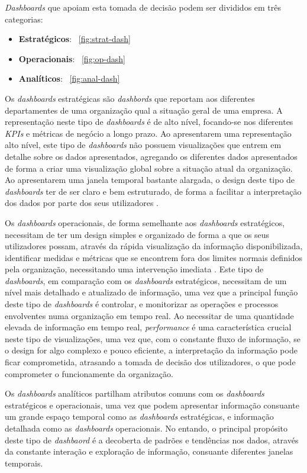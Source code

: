 \textit{Dashboards} que apoiam esta tomada de decisão podem ser divididos em três categorias:

\begin{itemize}
  \item \textbf{Estratégicos}: ~\ref{fig:strat-dash}
  \item \textbf{Operacionais}: ~\ref{fig:op-dash}
  \item \textbf{Analíticos}: ~\ref{fig:anal-dash}
\end{itemize}

Os \textit{dashboards} estratégicas são \textit{dashbords} que reportam aos diferentes departamentes de uma organização qual a situação geral de uma empresa. A representação neste tipo de \textit{dashboards} é de alto nível, focando-se nos diferentes \textit{KPIs} e métricas de negócio a longo prazo. Ao apresentarem uma representação alto nível, este tipo de \textit{dashboards} não possuem visualizações que entrem em detalhe sobre os dados apresentados, agregando os diferentes dados apresentados de forma a criar uma visualização global sobre a situação atual da organização. Ao apresentarem uma janela temporal bastante alargada, o design deste tipo de \textit{dashboards} ter de ser claro e bem estruturado, de forma a facilitar a interpretação dos dados por parte dos seus utilizadores \cite{pappas2011riding}. 

Os \textit{dashboards} operacionais, de forma semelhante aos \textit{dashboards} estratégicos, necessitam de ter um design simples e organizado de forma a que os seus utilizadores possam, através da rápida visualização da informação disponibilizada, identificar medidas e métricas que se encontrem fora dos limites normais definidos pela organização, necessitando uma intervenção imediata \cite{pappas2011riding}. Este tipo de \textit{dashboards}, em comparação com os \textit{dashboards} estratégicos, necessitam de um nível mais detalhado e atualizado de informação, uma vez que a principal função deste tipo de \textit{dashboards} é controlar, e monitorizar as operações e processos envolventes numa organização em tempo real. Ao necessitar de uma quantidade elevada de informação em tempo real, \textit{performance} é uma característica crucial neste tipo de visualizações, uma vez que, com o constante fluxo de informação, se o design for algo complexo e pouco eficiente, a interpretação da informação pode ficar comprometida, atrasando a tomada de decisão dos utilizadores, o que pode comprometer o funcionamente da organização.

Os \textit{dashboards} analíticos partilham atributos comuns com os \textit{dashboards} estratégicos e operacionais, uma vez que podem apresentar informação consuante um grande espaço temporal como as \textit{dashboards} estratégicas, e informação detalhada como as \textit{dashboards} operacionais. No entando, o principal propósito deste tipo de \textit{dashbaord} é a decoberta de padrões e tendências nos dados, através da constante interação e exploração de informação, consuante diferentes janelas temporais.

